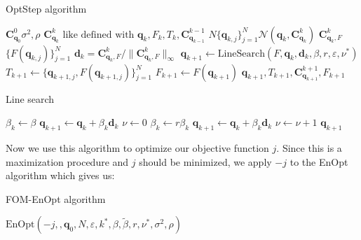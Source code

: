 \begin{algorithm}[H]%
\caption{OptStep algorithm}
\begin{algorithmic}[1]
\State {}$\mathbf{C}_{\mathbf{q}_0}^0$$\sigma^2,\rho$
\Else
\State {}$\mathbf{C}_{\mathbf{q}_{k}}^{k}\text{ like defined with }\mathbf{q}_k,F_k,T_k,\mathbf{C}_{\mathbf{q}_{k-1}}^{k-1}$
\EndIf
\State {}$N$$\{\mathbf{q}_{k,j}\}_{j=1}^N$$\mathcal{N}(\mathbf{q}_{k},\mathbf{C}_{\mathbf{q}_{k}}^{k})$
\State {}$\mathbf{C}_{\mathbf{q}_{k},F}^{k}$$\{F(\mathbf{q}_{k,j})\}_{j=1}^N$
\State {}$\mathbf{d}_k=\mathbf{C}_{\mathbf{q}_{k},F}^{k}/\|\mathbf{C}_{\mathbf{q}_{k},F}^{k}\|_\infty$
\State $\mathbf{q}_{k+1}\gets\mathrm{LineSearch}(F,\mathbf{q}_k,\mathbf{d}_k,\beta,r,\varepsilon,\nu^*)$
\State $T_{k+1}\gets\{\mathbf{q}_{k+1,j},F(\mathbf{q}_{k+1,j})\}_{j=1}^N$
\State $F_{k+1}\gets F(\mathbf{q}_{k+1})$
\State \Return $\mathbf{q}_{k+1},T_{k+1},\mathbf{C}_{\mathbf{q}_{{k+1}}}^{{k+1}},F_{k+1}$
\EndProcedure
\end{algorithmic}
\end{algorithm}
\begin{algorithm}[H]%
\caption{Line search}
\begin{algorithmic}[1]
\State $\beta_k \gets \beta$
\State $\mathbf{q}_{k+1} \gets \mathbf{q}_k+\beta_k\mathbf{d}_k$
\State $\nu \gets 0$
\State $\beta_k \gets r\beta_k$
\State $\mathbf{q}_{k+1} \gets \mathbf{q}_k+\beta_k\mathbf{d}_k$
\State $\nu \gets \nu+1$
\EndWhile
\Return $\mathbf{q}_{k+1}$
\EndProcedure
\end{algorithmic}
\end{algorithm}
Now we use this algorithm to optimize our objective function $j$. Since this is a maximization procedure and $j$ should be minimized, we apply $-j$ to the EnOpt algorithm which gives us:
\begin{algorithm}[H]%
\caption{FOM-EnOpt algorithm}
\begin{algorithmic}[1]
\State \Return $\mathrm{EnOpt}(-j,,\mathbf{q}_0,N,\varepsilon,k^*,\beta,\tilde{\beta},r,\nu^*,\sigma^2,\rho)$
\EndProcedure
\end{algorithmic}
\end{algorithm}